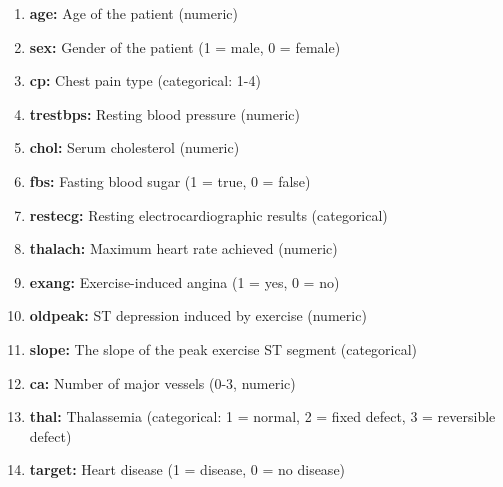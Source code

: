 \documentclass[
]{article}
\providecommand{\tightlist}{%
  \setlength{\itemsep}{0pt}\setlength{\parskip}{0pt}}
\begin{document}
\begin{enumerate}
\def\labelenumi{\arabic{enumi}.}
\tightlist
\item
  \textbf{age:} Age of the patient (numeric)
\item
  \textbf{sex:} Gender of the patient (1 = male, 0 = female)
\item
  \textbf{cp:} Chest pain type (categorical: 1-4)
\item
  \textbf{trestbps:} Resting blood pressure (numeric)
\item
  \textbf{chol:} Serum cholesterol (numeric)
\item
  \textbf{fbs:} Fasting blood sugar (1 = true, 0 = false)
\item
  \textbf{restecg:} Resting electrocardiographic results (categorical)
\item
  \textbf{thalach:} Maximum heart rate achieved (numeric)
\item
  \textbf{exang:} Exercise-induced angina (1 = yes, 0 = no)
\item
  \textbf{oldpeak:} ST depression induced by exercise (numeric)
\item
  \textbf{slope:} The slope of the peak exercise ST segment
  (categorical)
\item
  \textbf{ca:} Number of major vessels (0-3, numeric)
\item
  \textbf{thal:} Thalassemia (categorical: 1 = normal, 2 = fixed defect,
  3 = reversible defect)
\item
  \textbf{target:} Heart disease (1 = disease, 0 = no disease)
\end{enumerate}
\end{document}

